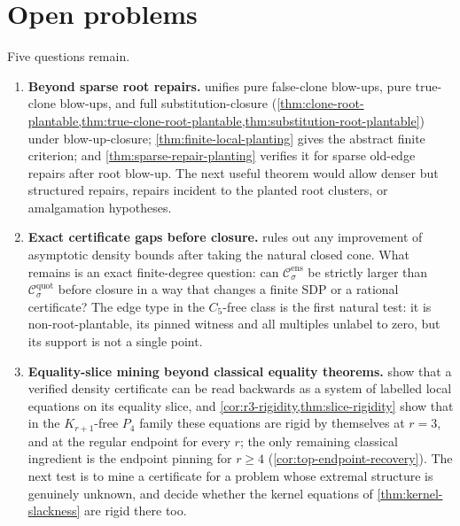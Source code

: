 \documentclass[11pt]{article}
\theoremstyle{definition}
\newcommand{\C}{\mathcal{C}}
\begin{document}
\section{Open problems}

Five questions remain.

\begin{enumerate}[label=\textup{(\arabic*)}, leftmargin=2.8em]
  \item \textbf{Beyond sparse root repairs.}
   unifies pure false-clone blow-ups, pure true-clone
  blow-ups, and full substitution-closure
  (\cref{thm:clone-root-plantable,thm:true-clone-root-plantable,thm:substitution-root-plantable})
  under blow-up-closure; \cref{thm:finite-local-planting} gives the abstract finite criterion; and
  \cref{thm:sparse-repair-planting} verifies it for sparse old-edge repairs after
  root blow-up.  The next useful theorem would allow denser but structured repairs,
  repairs incident to the planted root clusters, or amalgamation hypotheses.

  \item \textbf{Exact certificate gaps before closure.}
   rules out any improvement of asymptotic density
  bounds after taking the natural closed cone.  What remains is an exact finite-degree
  question: can $\C^{\mathrm{ens}}_\sigma$ be strictly larger than
  $\C^{\mathrm{quot}}_\sigma$ before closure in a way that changes a finite SDP or a
  rational certificate?  The edge type in the $C_5$-free class is the first natural test:
  it is non-root-plantable, its pinned witness and all multiples unlabel to zero, but its
  support is not a single point.

  \item \textbf{Equality-slice mining beyond classical equality theorems.}
   show that a verified
  density certificate can be read backwards as a system of labelled local equations on its
  equality slice, and \cref{cor:r3-rigidity,thm:slice-rigidity} show that in the
  $K_{r+1}$-free $P_4$ family these equations are rigid by themselves at $r=3$, and at
  the regular endpoint for every $r$; the only remaining classical ingredient is the
  endpoint pinning for $r\ge4$ (\cref{cor:top-endpoint-recovery}).  The next test is to
  mine a certificate for a problem whose extremal structure is genuinely unknown, and
  decide whether the kernel equations of \cref{thm:kernel-slackness} are rigid there
  too.


\end{enumerate}
\end{document}
